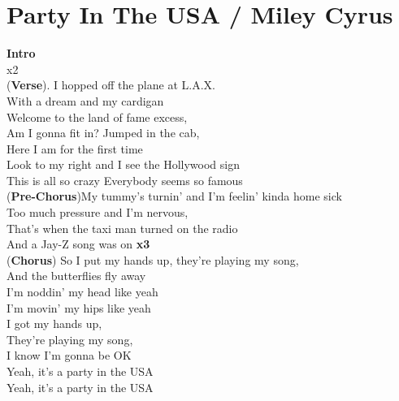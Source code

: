 \section{Party In The USA / Miley Cyrus}\label{sec:partyintheusa}

\Cmajor
\Eminor
\Aminor
\Gmajor
\Dminor
\Fmajor


\textbf{Intro} \\
     x2\\
(\textbf{Verse}). I hopped off the plane at L.A.X.\\
With a dream and my cardigan\\
Welcome to the land of fame excess,\\
Am I gonna fit in? Jumped in the cab,\\
Here I am for the first time\\
Look to my right and I see the Hollywood sign\\
This is all so crazy Everybody seems so famous\\
(\textbf{Pre-Chorus})My tummy's turnin' and I'm feelin' kinda home sick\\
Too much pressure and I'm nervous,\\
That's when the taxi man turned on the radio\\
And a Jay-Z song was on  \textbf{x3}\\
(\textbf{Chorus}) So I put my hands up, they're playing my song,\\
And the butterflies fly away\\
I'm noddin' my head like yeah\\
I'm movin' my hips like yeah\\
I got my hands up,\\
They're playing my song,\\
I know I'm gonna be OK\\
Yeah, it's a party in the USA\\
Yeah, it's a party in the USA\\
